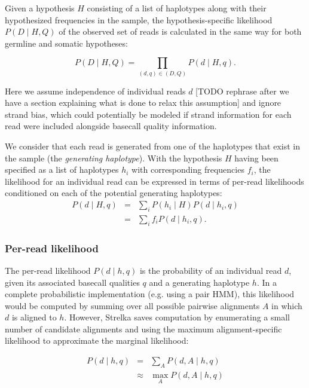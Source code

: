 \documentclass{article}
\begin{document}
Given a hypothesis $H$ consisting of a list of haplotypes along with their hypothesized frequencies in the sample, the hypothesis-specific likelihood $P(D \mid H,Q)$ of the observed set of reads is calculated in the same way for both germline and somatic hypotheses:

\begin{equation*}
\label{eq:geno_lik}
P(D \mid H,Q) = \prod_{(d,q) \in (D,Q)} P(d \mid H,q).
\end{equation*}

Here we assume independence of individual reads $d$ [TODO rephrase after we have a section explaining what is done to relax this assumption] and ignore strand bias, which could potentially be modeled if strand information for each read were included alongside basecall quality information.

We consider that each read is generated from one of the haplotypes that exist in the sample (the \emph{generating haplotype}). With the hypothesis $H$ having been specified as a list of haplotypes $h_i$ with corresponding frequencies $f_i$, the likelihood for an individual read can be expressed in terms of per-read likelihoods conditioned on each of the potential generating haplotypes:
\begin{eqnarray*}
P(d \mid H,q) & = & \sum_i P(h_i \mid H)P(d \mid h_i,q)\\
& = & \sum_i f_i P(d \mid h_i,q).
\end{eqnarray*}

\subsubsection{Per-read likelihood}
The per-read likelihood $P(d \mid h,q)$ is the probability of an individual read $d$, given its associated basecall qualities $q$ and a generating haplotype $h$. In a complete probabilistic implementation (e.g. using a pair HMM), this likelihood would be computed by summing over all possible pairwise alignments $A$ in which $d$ is aligned to $h$. However, Strelka saves computation by enumerating a small number of candidate alignments and using the maximum alignment-specific likelihood to approximate the marginal likelihood:

\begin{eqnarray*}
\label{eq:read_lik}
P(d \mid h,q) & = & \sum_A P(d,A \mid h,q)\\
& \approx & \max_A P(d,A \mid h,q)
\end{eqnarray*}
\end{document}
